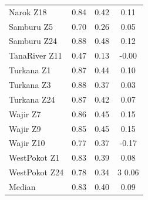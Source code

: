 \documentclass[review]{elsarticle}
\begin{document}
\begin{table}
\begin{tabular}{l|ccc}
		Narok Z18 &  0.84 &  0.42 & 0.11 \\
		Samburu Z5 &  0.70 &  0.26 & 0.05 \\
		Samburu Z24 &  0.88 &  0.48 & 0.12 \\
		TanaRiver Z11 &  0.47 &  0.13 & -0.00 \\
		Turkana Z1 &  0.87 &  0.44 & 0.10 \\
		Turkana Z3 &  0.88 &  0.37 & 0.03 \\
		Turkana Z24 &  0.87 &  0.42 & 0.07 \\
		Wajir Z7 &  0.86 &  0.45 & 0.15 \\
		Wajir Z9 &  0.85 &  0.45 & 0.15 \\
		Wajir Z10 &  0.77 &  0.37 & -0.17 \\
		WestPokot Z1 &  0.83 &  0.39 & 0.08 \\
		WestPokot Z24 &  0.78 &  0.34 &3 0.06 \\
		\bottomrule
		Median &  0.83 &  0.40 & 0.09 \\
		\bottomrule
	\end{tabular}
\end{table}
\end{document}
